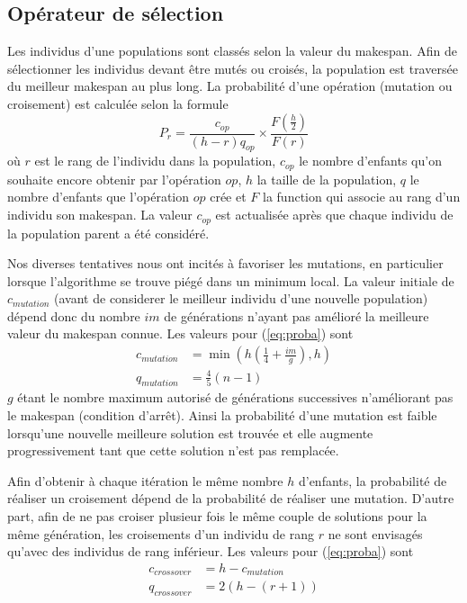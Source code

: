 \documentclass[french]{rapport}
\begin{document}
\subsection{Opérateur de sélection}

\newcommand{\op}{\mathit{op}}
\newcommand{\mut}{\mathit{mutation}}
\newcommand{\co}{\mathit{crossover}}

Les individus d'une populations sont classés selon la valeur du makespan. Afin de sélectionner les
individus devant être mutés ou croisés, la population est traversée du meilleur makespan au plus
long. La probabilité d'une opération (mutation ou croisement) est calculée selon la formule
\begin{equation} \label{eq:proba}
 P_r = \frac{c_\op}{(h-r)q_\op} \times \frac{F\left( \frac{h}{2} \right)}{F(r)}
\end{equation}
où $r$ est le rang de l'individu dans la population, $c_\op$ le nombre d'enfants qu'on souhaite
encore obtenir par l'opération $\op$, $h$ la taille de la population, $q$ le nombre d'enfants que
l'opération $\op$ crée et $F$ la function qui associe au rang d'un individu son makespan. La valeur
$c_\op$ est actualisée après que chaque individu de la population parent a été considéré.

Nos diverses tentatives nous ont incités à favoriser les mutations, en particulier lorsque
l'algorithme se trouve piégé dans un minimum local. La valeur initiale de $c_\mut$ (avant de
considerer le meilleur individu d'une nouvelle population) dépend donc du nombre $\mathit{im}$ de générations
n'ayant pas amélioré la meilleure valeur du makespan connue. Les valeurs pour (\ref{eq:proba}) sont
\begin{align*}
  c_\mut &= \min \left(h \left( \frac{1}{4} + \frac{\mathit{im}}{g} \right) , h \right) \\
  q_\mut &= \frac{4}{5} (n-1)
\end{align*}
$g$ étant le nombre maximum autorisé de générations successives n'améliorant pas le makespan
(condition d'arrêt). Ainsi la probabilité d'une mutation est faible lorsqu'une nouvelle meilleure
solution est trouvée et elle augmente progressivement tant que cette solution n'est pas remplacée.

Afin d'obtenir à chaque itération le même nombre $h$ d'enfants, la probabilité de réaliser un
croisement dépend de la probabilité de réaliser une mutation. D'autre part, afin de ne pas croiser
plusieur fois le même couple de solutions pour la même génération, les croisements d'un individu de
rang $r$ ne sont envisagés qu'avec des individus de rang inférieur. Les valeurs pour
(\ref{eq:proba}) sont
\begin{align*}
  c_\co &= h - c_\mut \\
  q_\co &= 2 \left( h - (r + 1) \right)
\end{align*}
\end{document}
